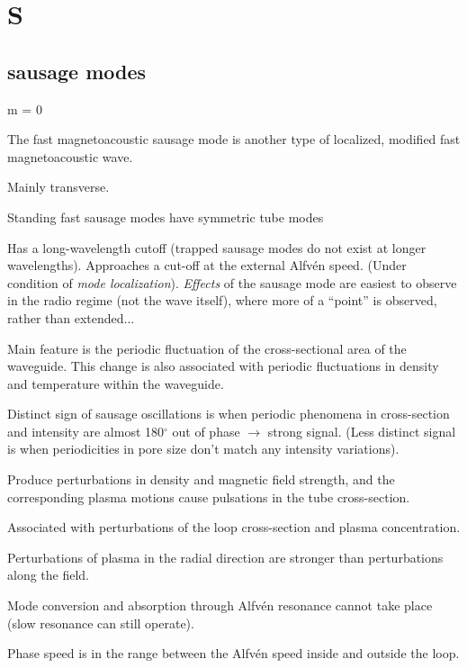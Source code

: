 \documentclass[12pt]{article}
\begin{document}
\section*{S}

\subsection*{sausage modes}
\begin{itemize*}
    \item m = 0
    \item The fast magnetoacoustic sausage mode is another type of
        localized, modified fast magnetoacoustic wave.
    \item Mainly transverse.
    \item Standing fast sausage modes have symmetric tube modes
    \item Has a long-wavelength cutoff (trapped sausage modes do
        not exist at longer wavelengths).
        Approaches a cut-off at the external Alfv\'en speed.
        (Under condition of \emph{mode localization}).
        \emph{Effects} of the sausage mode are easiest to observe in
        the radio regime (not the wave itself), where more of a
        ``point'' is observed, rather than extended$\ldots$
    \item Main feature is the periodic fluctuation of the cross-sectional
        area of the waveguide. This change is also associated with
        periodic fluctuations in density and temperature within the
        waveguide.
    \item Distinct sign of sausage oscillations is when periodic
        phenomena in cross-section and intensity are almost
        180$^{\circ}$ out of phase $\rightarrow$ strong signal.
        (Less distinct signal is when periodicities in pore size
        don't match any intensity variations).
    \item Produce perturbations in density and magnetic field strength,
        and the corresponding plasma motions cause pulsations in the
        tube cross-section.
    \item Associated with perturbations of the loop cross-section
        and plasma concentration.
    \item Perturbations of plasma in the radial direction are stronger
        than perturbations along the field.
    \item Mode conversion and absorption through Alfv\'en resonance
        cannot take place (slow resonance can still operate).
    \item Phase speed is in the range between the Alfv\'en speed inside
        and outside the loop.
\end{itemize*}
\end{document}
